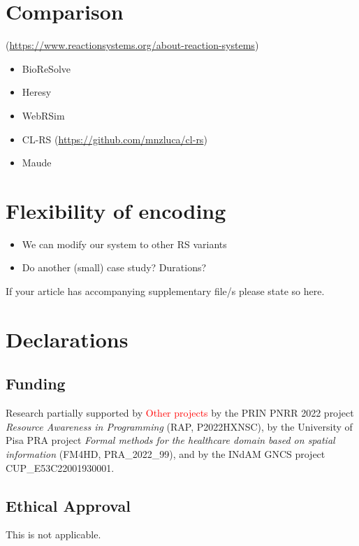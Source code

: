 \documentclass[sn-mathphys-num,a4paper,iicol,lineno,pdflatex]{sn-jnl-hacked}
\theoremstyle{thmstyleone}%
\theoremstyle{thmstyletwo}%
\theoremstyle{thmstylethree}%
\begin{document}
\section{Comparison}
(\url{https://www.reactionsystems.org/about-reaction-systems})
\begin{itemize}
\item BioReSolve
\item Heresy
\item WebRSim
\item CL-RS (\url{https://github.com/mnzluca/cl-rs})
\item Maude
\end{itemize}

\section{Flexibility of encoding}
\begin{itemize}
\item We can modify our system to other RS variants
\item Do another (small) case study? Durations?
\end{itemize}



\backmatter


If your article has accompanying supplementary file/s please state so here. 


\section*{Declarations}

\subsection*{Funding}

Research partially supported 
by \textcolor{red}{Other projects}
by the PRIN PNRR 2022 project \emph{Resource Awareness in Programming} (RAP, P2022HXNSC),
by the University of Pisa PRA project \emph{Formal methods for the healthcare domain based on spatial information} (FM4HD, PRA\_2022\_99),
and by the INdAM GNCS project CUP\_E53C22001930001.

\subsection*{Ethical Approval}
This is not applicable.
 
\end{document}
